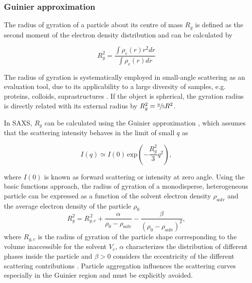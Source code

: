 \subsubsection{Guinier approximation}
\label{sec:TheoryGuinier}

The radius of gyration of a particle about its centre of mass $R_g$ is defined as the second moment of the electron density distribution and can be calculated by 

\begin{equation}
        R_g^2 = \frac{\int \rho_e (r) r^2 dr}{\int \rho_e (r)  dr}
\end{equation}

The radius of gyration is systematically employed in small-angle scattering as an evaluation tool, due to its applicability to a large diversity of samples, e.g. proteins, colloids, suprastructures \citep{mertens_structural_2010,sim_salt_2012}. If the object is spherical, the gyration radius is directly related with its external radius by $R_g^2 = \sfrac{3}{5}R^2$.

In SAXS, $R_g$ can be calculated using the Guinier approximation \citep{guinier_diffraction_1939,guinier_small-angle_1955}, which assumes that the scattering intensity behaves in the limit of small \(q\) as

\begin{equation}
\label{eq:guinier}
I(q) \simeq I(0)\,\mbox{exp}\left(-\frac{R_g^2}{3}q^2\right),
\end{equation}

where \( I(0)\) is known as forward scattering or intensity at zero angle. Using the basic functions approach, the radius of gyration of a monodisperse, heterogeneous particle can be expressed as a function of the solvent electron density \( \rho_{\text{solv}} \) and the average electron density of the particle \( \rho_0 \) \citep{feigin_structure_1987}
\begin{equation}
R_g^2=R_{g,c}^{\,2}+\frac{\alpha}{\rho_0-\rho_{\text{solv}}}-\frac{\beta}{(\rho_0-\rho_{\text{solv}})^2},
\label{eq:gyration}
\end{equation}
where \(R_{g,c}\) is the radius of gyration of the particle shape corresponding to the volume inaccessible for the solvent \( V_c \), \( \alpha \) characterizes the distribution of different phases inside the particle and \( \beta>0 \) considers the eccentricity of the different scattering contributions \citep{stuhrmann_small-angle_2008}. Particle aggregation influences the scattering curves especially in the Guinier region and must be explicitly avoided.

